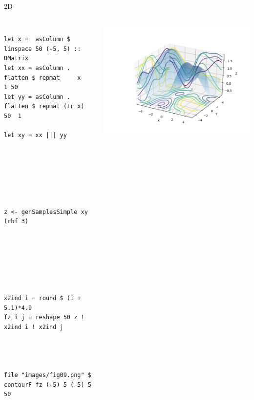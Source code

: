 \documentclass[presentation]{beamer}
\begin{document}
\begin{frame}[fragile,label={sec:org66a987a}]{2D}
 \begin{columns}
\begin{column}{0.35\columnwidth}
\begin{verbatim}

let x =  asColumn $ linspace 50 (-5, 5) :: DMatrix
let xx = asColumn . flatten $ repmat     x   1 50
let yy = asColumn . flatten $ repmat (tr x) 50  1

let xy = xx ||| yy







z <- genSamplesSimple xy (rbf 3)







x2ind i = round $ (i + 5.1)*4.9
fz i j = reshape 50 z ! x2ind i ! x2ind j




file "images/fig09.png" $ contourF fz (-5) 5 (-5) 5 50

\end{verbatim}
\end{column}



\begin{column}{0.65\columnwidth}
\begin{center}
\includegraphics[width=.9\linewidth]{images/fig09.png}
\end{center}
\end{column}
\end{columns}
\end{frame}
\end{document}

